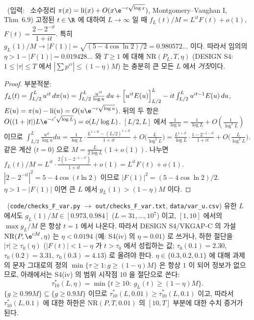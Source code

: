 \begin{proposition}\label{NUM:prop-t1}
\PROVED\ (입력: \EXT\ 소수정리 $\pi(x)=\mathrm{li}(x)+O(x\e^{-c\sqrt{\log x}})$, Montgomery--Vaughan I, Thm~6.9)
고정된 $t\in\R$ 에 대하여 $L\to\infty$ 일 때 $f_L(t)/M = L^{it}F(t)+o(1)$, $F(t)=\dfrac{2-2^{-it}}{1+it}$.
특히 $g_L(1)/M\to|F(1)|=\sqrt{(5-4\cos\ln2)/2}=0.980572\ldots$ 이다. 따라서 임의의 $\eta>1-|F(1)|=0.019428\ldots$ 와 $T\ge1$ 에 대해
$\mathrm{NR}(P_L,T,\eta)$ (DESIGN S4: $1\le|\tau|\le T$ 에서 $|\sum p^{i\tau}|\le(1-\eta)M$) 는 충분히 큰 모든 $L$ 에서 \emph{거짓}이다.
\end{proposition}
\begin{proof}
부분적분: $f_L(t)=\int_{L/2}^{L}u^{it}\,d\pi(u)=\int_{L/2}^{L}\frac{u^{it}}{\log u}\,du+\Bigl[u^{it}E(u)\Bigr]_{L/2}^{L}-it\int_{L/2}^{L}u^{it-1}E(u)\,du$,
$E(u)=\pi(u)-\mathrm{li}(u)=O(u\e^{-c\sqrt{\log u}})$. 뒤의 두 항은 $O((1+|t|)L\e^{-c'\sqrt{\log L}})=o(L/\log L)$.
$[L/2,L]$ 에서 $\frac1{\log u}=\frac1{\log L}+O(\frac1{\log^2L})$ 이므로
$\int_{L/2}^{L}\frac{u^{it}}{\log u}du=\frac{1}{\log L}\cdot\frac{L^{1+it}-(L/2)^{1+it}}{1+it}+O\bigl(\frac{L}{\log^2L}\bigr)
=\frac{L^{1+it}}{\log L}\cdot\frac{1-2^{-1-it}}{1+it}+O\bigl(\frac{L}{\log^2L}\bigr)$.
같은 계산 ($t=0$) 으로 $M=\frac{L}{2\log L}(1+o(1))$. 나누면 $f_L(t)/M=L^{it}\cdot\frac{2(1-2^{-1-it})}{1+it}+o(1)=L^{it}F(t)+o(1)$.
$|2-2^{-it}|^2=5-4\cos(t\ln2)$ 이므로 $|F(1)|^2=(5-4\cos\ln 2)/2$. $\eta>1-|F(1)|$ 이면 큰 $L$ 에서 $g_L(1)>(1-\eta)M$ 이다.
\end{proof}

\begin{remark}\label{NUM:rem-t1}
\NUMERIC\ (\texttt{code/checks\_F\_var.py} $\to$ \texttt{out/checks\_F\_var.txt}, \texttt{data/var\_u.csv})
유한 $L$ 에서도 $g_L(1)/M\in[0.973,0.984]$ ($L=31,\dots,10^7$) 이고, $[1,10]$ 에서의 $\max g_L/M$ 은 항상 $t=1$ 에서 나온다.
따라서 DESIGN S4/VKGAP-C 의 가설 $\mathrm{NR}(P,\e^{cM},\eta)$ 는 \emph{$\eta<0.0194$} (예: S4(iv) 의 $\eta=0.01$) 로 쓰거나,
하한 절단을 $|\tau|\ge\tau_0(\eta)$ ($|F(t)|<1-\eta$ 가 $t>\tau_0$ 에서 성립하는 값; $\tau_0(0.1)=2.30$, $\tau_0(0.2)=3.31$, $\tau_0(0.3)=4.13$) 로
올려야 한다. $\eta\in\{0.3,0.2,0.1\}$ 에 대해 과제의 문자 그대로의 정의 $\min\{\tau\ge1:g\ge(1-\eta)M\}$ 은 항상 $1$ 이 되어 정보가 없으므로,
아래에서는 S4(iv) 의 범위 시작점 $10$ 을 절단으로 쓴다:
\[
\tau^*_{10}(L,\eta)=\min\{t\ge10:\ g_L(t)\ge(1-\eta)M\}.
\]
$\{g\ge0.99M\}\subseteq\{g\ge0.9M\}$ 이므로 $\tau^*_{10}(L,0.01)\ge\tau^*_{10}(L,0.1)$ 이고, 따라서 $\tau^*_{10}(L,0.1)$ 에 대한 하한은
$\mathrm{NR}(P,T,0.01)$ 의 $[10,T]$ 부분에 대한 수치 증거가 된다.
\end{remark}


